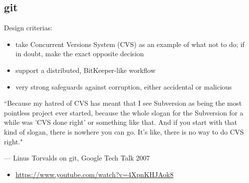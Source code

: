 \subsection{git}
\begin{frame}
  \subslidetitle

  Design criterias:
  \begin{itemize}
    \item take Concurrent Versions System (CVS) as an example of what not to do; if in doubt, make the exact opposite decision
    \item support a distributed, BitKeeper-like workflow
    \item very strong safeguards against corruption, either accidental or malicious
  \end{itemize}

  \vspace{1cm}
  \epigraph{``Because my hatred of CVS has meant that I see Subversion as being the most pointless project ever started, because the whole slogan for the Subversion for a while was 'CVS done right' or something like that. And if you start with that kind of slogan, there is nowhere you can go. It's like, there is no way to do CVS right."}
{--- Linus Torvalds on git, Google Tech Talk 2007}

  \begin{itemize}
     \item\url{https://www.youtube.com/watch?v=4XpnKHJAok8}
  \end{itemize}
\end{frame}



